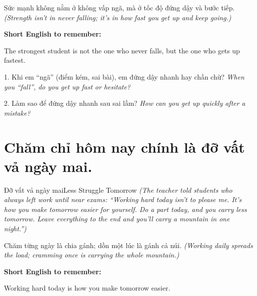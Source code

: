 \begin{baihoc}
Sức mạnh không nằm ở không vấp ngã, mà ở tốc độ đứng dậy và bước tiếp.
\textit{(Strength isn't in never falling; it's in how fast you get up and keep going.)}
\end{baihoc}

\begin{ghinhoanh}
\textbf{Short English to remember:}

The strongest student is not the one who never falls, but the one who gets up fastest.

\end{ghinhoanh}

\begin{tuhocnhanh}
1. Khi em ``ngã'' (điểm kém, sai bài), em đứng dậy nhanh hay chần chừ? \textit{When you ``fall'', do you get up fast or hesitate?}

2. Làm sao để đứng dậy nhanh sau sai lầm? \textit{How can you get up quickly after a mistake?}
\end{tuhocnhanh}
\ngancach

\section{Chăm chỉ hôm nay chính là đỡ vất vả ngày mai.}
\begin{truyen}{Đỡ vất vả ngày mai}{Less Struggle Tomorrow}
\textit{(The teacher told students who always left work until near exams: ``Working hard today isn't to please me. It's how you make tomorrow easier for yourself. Do a part today, and you carry less tomorrow. Leave everything to the end and you'll carry a mountain in one night.'')}
\end{truyen}

\begin{baihoc}
Chăm từng ngày là chia gánh; dồn một lúc là gánh cả núi.
\textit{(Working daily spreads the load; cramming once is carrying the whole mountain.)}
\end{baihoc}

\begin{ghinhoanh}
\textbf{Short English to remember:}

Working hard today is how you make tomorrow easier.

\end{ghinhoanh}

